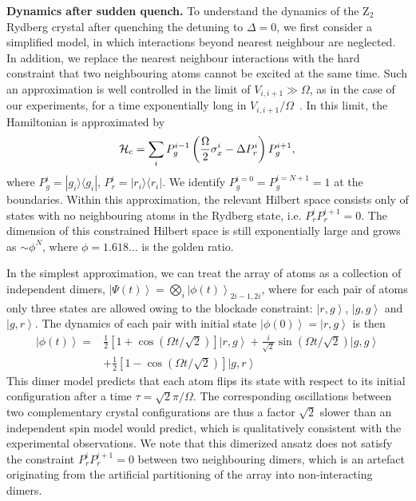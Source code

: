 \documentclass[prl,nobalancelastpage,twocolumn,superscriptaddress,nofootinbib]{revtex4}
\newcommand{\ket}[1]{\left|#1\right\rangle}
\newcommand{\ketbra}[2]{| #1\rangle\langle#2|}
\newcommand{\ham}{\mathcal{H}}
\begin{document}
\begin{footnotesize}
\noindent
\textbf{Dynamics after sudden quench.}
To understand the dynamics of the Z$_2$ Rydberg crystal after quenching
the detuning to $\Delta=0$, we first consider a simplified model, in which
interactions beyond nearest neighbour are neglected. In addition, we replace
the nearest neighbour interactions with the hard constraint that two neighbouring
atoms cannot be excited at the same time. Such an approximation is well
controlled in the limit of $V_{i,i+1} \gg \Omega$, as in the case of our
experiments, for a time exponentially long in
$V_{i,i+1}/\Omega$~\cite{Abanin2016}. In this limit, the Hamiltonian is
approximated by 
\begin{equation*}
\ham_{\rm c}=\sum_{i}P_g^{i-1}\left(\frac{\Omega}{2}\sigma_x^i-\Delta P_r^i\right)P_g^{i+1},
\end{equation*}
where $P_g^i=\ketbra{g_i}{g_i}$, $P_r^i=\ketbra{r_i}{r_i}$. We identify
$P_g^{i=0}=P_g^{i=N+1}=1$ at the boundaries. Within this approximation, the
relevant Hilbert space consists only of states with no neighbouring atoms in
the Rydberg state, i.e. $P_r^{i}P_r^{i+1}=0$. The dimension of this constrained
Hilbert space is still exponentially large and grows as $\sim \phi^N$, where
$\phi= 1.618\dots$ is the golden ratio. 

In the simplest approximation, we can treat the array of atoms as a collection
of independent dimers,  $\ket{\Psi(t)}=\bigotimes_i\ket{\phi(t)}_{2i-1,2i}$,
where for each pair of atoms only three states are allowed owing to the blockade
constraint: $\ket{r,g}$, $\ket{g,g}$ and $\ket{g,r}$. The dynamics of each pair
with initial state $\ket{\phi(0)}=\ket{r,g}$ is then
\begin{equation*}
    \begin{aligned}
        \ket{\phi(t)}=&\frac{1}{2}\left[1+\cos(\Omega
t/\sqrt{2})\right]\ket{r,g}+\frac{i}{\sqrt{2}}\sin(\Omega
t/\sqrt{2})\ket{g,g}\\
&+\frac{1}{2}\left[1-\cos(\Omega t/\sqrt{2})\right]\ket{g,r}
\end{aligned}
\end{equation*}
This dimer model predicts that each atom flips its state with respect to its initial
configuration after a time $\tau=\sqrt{2}\pi/\Omega$. The corresponding
oscillations between two complementary crystal configurations are thus a factor
$\sqrt{2}$ slower than an independent spin model would predict, which is
qualitatively consistent with the experimental observations. We note that this
dimerized ansatz does not satisfy the constraint $P_r^{i}P_r^{i+1}=0$ between
two neighbouring dimers, which is an artefact originating from the artificial
partitioning of the array into non-interacting dimers.


\end{footnotesize}
\end{document}
